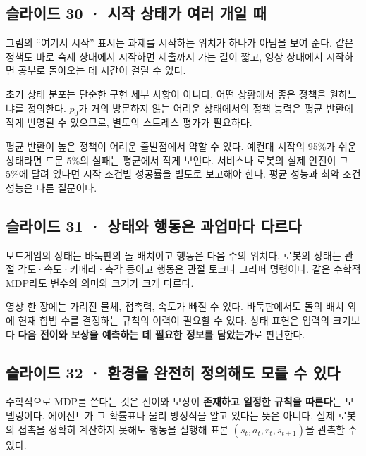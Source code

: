 \documentclass[11pt,a4paper]{article}
\begin{document}
\subsection{슬라이드 30 · 시작 상태가 여러 개일 때}

그림의 “여기서 시작” 표시는 과제를 시작하는 위치가 하나가 아님을 보여 준다. 같은 정책도 바로 숙제 상태에서 시작하면 제출까지 가는 길이 짧고, 영상 상태에서 시작하면 공부로 돌아오는 데 시간이 걸릴 수 있다.\par

초기 상태 분포는 단순한 구현 세부 사항이 아니다. 어떤 상황에서 좋은 정책을 원하느냐를 정의한다. $p_0$가 거의 방문하지 않는 어려운 상태에서의 정책 능력은 평균 반환에 작게 반영될 수 있으므로, 별도의 스트레스 평가가 필요하다.\par

평균 반환이 높은 정책이 어려운 출발점에서 약할 수 있다. 예컨대 시작의 95\%가 쉬운 상태라면 드문 5\%의 실패는 평균에서 작게 보인다. 서비스나 로봇의 실제 안전이 그 5\%에 달려 있다면 시작 조건별 성공률을 별도로 보고해야 한다. 평균 성능과 최악 조건 성능은 다른 질문이다.\par

\subsection{슬라이드 31 · 상태와 행동은 과업마다 다르다}

보드게임의 상태는 바둑판의 돌 배치이고 행동은 다음 수의 위치다. 로봇의 상태는 관절 각도·속도·카메라·촉각 등이고 행동은 관절 토크나 그리퍼 명령이다. 같은 수학적 MDP라도 변수의 의미와 크기가 크게 다르다.\par

영상 한 장에는 가려진 물체, 접촉력, 속도가 빠질 수 있다. 바둑판에서도 돌의 배치 외에 현재 합법 수를 결정하는 규칙의 이력이 필요할 수 있다. 상태 표현은 입력의 크기보다 \textbf{다음 전이와 보상을 예측하는 데 필요한 정보를 담았는가}로 판단한다.\par

\subsection{슬라이드 32 · 환경을 완전히 정의해도 모를 수 있다}

수학적으로 MDP를 쓴다는 것은 전이와 보상이 \textbf{존재하고 일정한 규칙을 따른다}는 모델링이다. 에이전트가 그 확률표나 물리 방정식을 알고 있다는 뜻은 아니다. 실제 로봇의 접촉을 정확히 계산하지 못해도 행동을 실행해 표본 $(s_t,a_t,r_t,s_{t+1})$을 관측할 수 있다.\par
\end{document}
